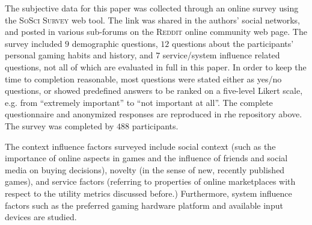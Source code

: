 The subjective data for this paper was collected through an online
survey using the \textsc{SoSci Survey} web tool. The link was shared
in the authors' social networks, and posted in various sub-forums on
the \textsc{Reddit} online community web page.
The survey included $9$ demographic questions, $12$ questions about the
participants' personal gaming habits and history, and $7$ service/system
influence related questions, not all of which are evaluated in full
in this paper.
In order to keep the time to completion reasonable, most questions
were stated either as yes/no questions, or showed predefined answers
to be ranked on a five-level Likert scale, e.g. from ``extremely
important'' to ``not important at all''.
The complete questionnaire and anonymized responses
are reproduced in rhe repository above.
The survey was completed by $488$ participants.

The context influence factors surveyed include social context (such
as the importance of online aspects in games and the influence of
friends and social media on buying decisions), novelty (in the sense
of new, recently published games), and service factors (referring to
properties of online marketplaces with respect to the utility metrics
discussed before.) Furthermore, system influence factors such as
the preferred gaming hardware platform and available input devices
are studied.
